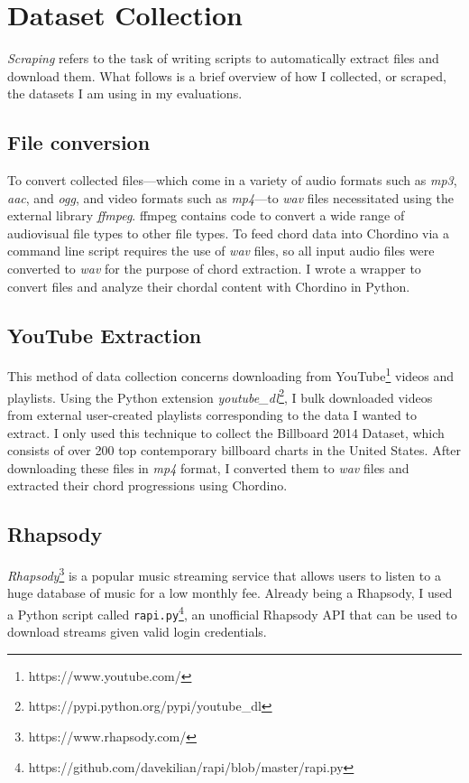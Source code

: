 \section{Dataset Collection}

\textit{Scraping} refers to the task of writing scripts to automatically extract files and download them. What follows is a brief overview of how I collected, or scraped, the datasets I am using in my evaluations.

\subsection{File conversion}

To convert collected files---which come in a variety of audio formats such as \textit{mp3}, \textit{aac}, and \textit{ogg}, and video formats such as \textit{mp4}---to \textit{wav} files necessitated using the external library \textit{ffmpeg}. ffmpeg contains code to convert a wide range of audiovisual file types to other file types. To feed chord data into Chordino via a command line script requires the use of \textit{wav} files, so all input audio files were converted to \textit{wav} for the purpose of chord extraction. I wrote a wrapper to convert files and analyze their chordal content with Chordino in Python.

\subsection{YouTube Extraction}

This method of data collection concerns downloading from YouTube\footnote{https://www.youtube.com/} videos and playlists. Using the Python extension \textit{youtube\_dl}\footnote{https://pypi.python.org/pypi/youtube\_dl}, I bulk downloaded videos from external user-created playlists corresponding to the data I wanted to extract. I only used this technique to collect the Billboard 2014 Dataset, which consists of over 200 top contemporary billboard charts in the United States. After downloading these files in \textit{mp4} format, I converted them to \textit{wav} files and extracted their chord progressions using Chordino.

\subsection{Rhapsody}

\textit{Rhapsody}\footnote{https://www.rhapsody.com/} is a popular music streaming service that allows users to listen to a huge database of music for a low monthly fee. Already being a Rhapsody, I used a Python script called \texttt{rapi.py}\footnote{https://github.com/davekilian/rapi/blob/master/rapi.py}, an unofficial Rhapsody API that can be used to download streams given valid login credentials.

